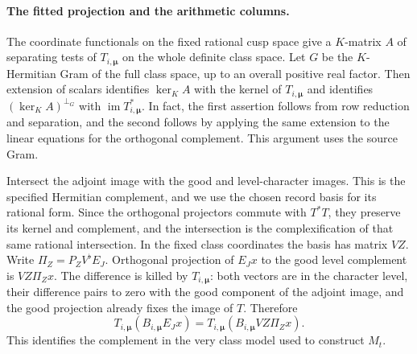 \paragraph{The fitted projection and the arithmetic columns.}
The coordinate functionals on the fixed rational cusp space give
a \(K\)-matrix \(A\) of separating tests of \(T_{i,\boldsymbol\mu}\)
on the whole definite class space. Let \(G\)
be the \(K\)-Hermitian Gram of the full class space, up to an
overall positive real factor. Then extension of scalars
identifies \(\ker_K A\) with the kernel of \(T_{i,\boldsymbol\mu}\)
and identifies \((\ker_K A)^{\perp_G}\) with
\(\operatorname{im}T_{i,\boldsymbol\mu}^*\). In fact, the
first assertion follows from row reduction and separation,
and the second follows by applying the same extension to the
linear equations for the orthogonal complement. This
argument uses the source Gram.

Intersect the adjoint image with the good and level-character
images. This is the specified Hermitian complement, and we
use the chosen record basis for its rational form.
Since the orthogonal projectors commute with \(T^*T\),
they preserve its kernel and complement, and the intersection
is the complexification of that same rational intersection.
In the fixed class coordinates the basis has matrix \(VZ\).
Write \(\Pi_Z=P_ZV^\flat E_J\). Orthogonal projection
of \(E_J x\) to the good level complement is \(VZ\Pi_Zx\).
The difference is killed by \(T_{i,\boldsymbol\mu}\):
both vectors are in the character level, their difference
pairs to zero with the good component of the adjoint image,
and the good projection already fixes the image of \(T\).
Therefore
\[
 T_{i,\boldsymbol\mu}(B_{i,\boldsymbol\mu}E_Jx)
   =T_{i,\boldsymbol\mu}(B_{i,\boldsymbol\mu}VZ\Pi_Zx).
\]
This identifies the complement in the very class model used
to construct \(M_t\).

